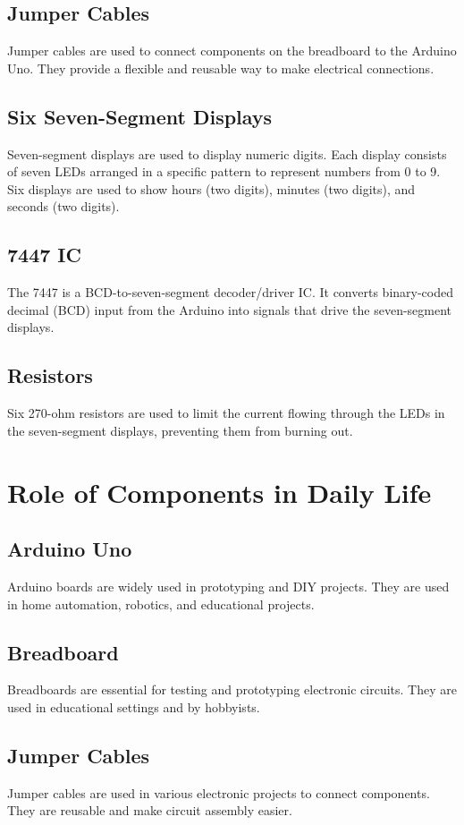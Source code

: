 \documentclass[journal]{IEEEtran}
\begin{document}
\subsection{Jumper Cables}
Jumper cables are used to connect components on the breadboard to the Arduino Uno. They provide a flexible and reusable way to make electrical connections.

\subsection{Six Seven-Segment Displays}
Seven-segment displays are used to display numeric digits. Each display consists of seven LEDs arranged in a specific pattern to represent numbers from 0 to 9. Six displays are used to show hours (two digits), minutes (two digits), and seconds (two digits).

\subsection{7447 IC}
The 7447 is a BCD-to-seven-segment decoder/driver IC. It converts binary-coded decimal (BCD) input from the Arduino into signals that drive the seven-segment displays.

\subsection{Resistors}
Six 270-ohm resistors are used to limit the current flowing through the LEDs in the seven-segment displays, preventing them from burning out.

\section{Role of Components in Daily Life}
\subsection{Arduino Uno}
Arduino boards are widely used in prototyping and DIY projects. They are used in home automation, robotics, and educational projects.

\subsection{Breadboard}
Breadboards are essential for testing and prototyping electronic circuits. They are used in educational settings and by hobbyists.

\subsection{Jumper Cables}
Jumper cables are used in various electronic projects to connect components. They are reusable and make circuit assembly easier.
\end{document}
